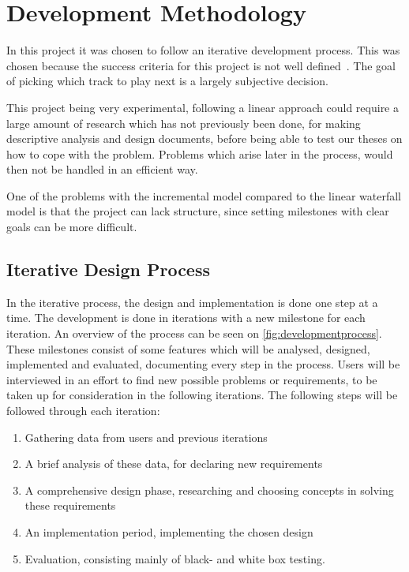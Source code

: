 \chapter{Development Methodology}

In this project it was chosen to follow an iterative development process. This was chosen because the success criteria for this project is not well defined~\cite{dahlbom1993computers}. The goal of picking which track to play next is a largely subjective decision.

This project being very experimental, following a linear approach could require a large amount of research which has not previously been done, for making descriptive analysis and design documents, before being able to test our theses on how to cope with the problem. Problems which arise later in the process, would then not be handled in an efficient way.

One of the problems with the incremental model compared to the linear waterfall model is that the project can lack structure, since setting milestones with clear goals can be more difficult.

\section{Iterative Design Process}
\label{IterativeDesignProcess}
In the iterative process, the design and implementation is done one
step at a time. The development is done in iterations with a new
milestone for each iteration. An overview of the process can be seen
on \cref{fig:developmentprocess}. These milestones consist of some
features which will be analysed, designed, implemented and evaluated,
documenting every step in the process. Users will be interviewed in an
effort to find new possible problems or requirements, to be taken up
for consideration in the following iterations. The following steps
will be followed through each iteration:

\begin{enumerate}
  \item Gathering data from users and previous iterations
  \item A brief analysis of these data, for declaring new requirements
  \item A comprehensive design phase, researching and choosing concepts in solving these requirements
  \item An implementation period, implementing the chosen design
  \item Evaluation, consisting mainly of black- and white box testing.
\end{enumerate}

